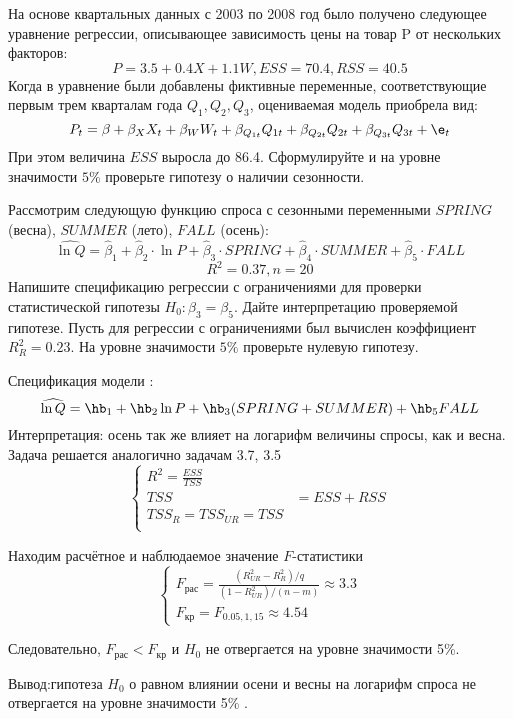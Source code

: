 \documentclass[pdftex,11pt,openany]{book}\usepackage[]{graphicx}\usepackage[]{color}
\begin{document}
\begin{problem} %
 На основе квартальных данных с 2003 по 2008 год было получено следующее уравнение регрессии, описывающее зависимость цены на товар P от нескольких факторов:
\[
P=3.5+0.4X+1.1W, ESS=70.4, RSS=40.5
\]
Когда в уравнение были добавлены фиктивные переменные, соответствующие первым
трем кварталам года $Q_1, Q_2, Q_3$, оцениваемая модель приобрела вид:
\[
P_t=\beta+\beta_X X_t+\beta_W W_t+\beta_{Q_{1t}} Q_{1t}+\beta_{Q_{2t}} Q_{2t}+\beta_{Q_{3t}} Q_{3t}+\e_t
\]
При этом величина $ESS$ выросла до 86.4. Сформулируйте и на уровне значимости $5\%$ проверьте гипотезу о наличии сезонности.
\end{problem}

\begin{solution}
\end{solution}


\begin{problem} %
 Рассмотрим следующую функцию спроса с сезонными переменными $SPRING$ (весна), $SUMMER$ (лето), $FALL$ (осень):
\[
\widehat{\ln Q}=\hat{\beta}_1+\hat{\beta}_2\cdot{\ln P}+\hat{\beta}_3\cdot{SPRING}+\hat{\beta}_4\cdot{SUMMER}+\hat{\beta}_5\cdot{FALL}
\]
\[
R^2=0.37,n=20
\]
Напишите спецификацию регрессии с ограничениями для проверки статистической гипотезы $H_0: \beta_3 = \beta_5$. Дайте интерпретацию проверяемой гипотезе. Пусть для регрессии с ограничениями был вычислен коэффициент $R_{R}^2=0.23$. На уровне значимости $5\%$ проверьте нулевую гипотезу.
\end{problem}

\begin{solution}
Спецификация модели : 
\[
\widehat{\ln{Q}} = \hb_1+\hb_2 \ln{P}+\hb_3(SPRING+SUMMER)+\hb_5 FALL 
\]
Интерпретация: осень так же влияет на логарифм величины спросы, как и весна. Задача решается аналогично задачам 3.7, 3.5
\[
\begin{cases}
R^2=\frac{ESS}{TSS}\\
TSS&=ESS+RSS\\
TSS_R=TSS_{UR}=TSS\\
\end{cases}
\]

Находим расчётное и наблюдаемое значение $F$-статистики
\[
\begin{cases}
F_{\text{рас}}=\frac{(R_{UR}^2-R_{R}^2)/q}{(1-R^2_{UR})/(n-m)}\approx3.3\\
F_{\text{кр}}= F_{0.05,1,15}\approx 4.54
\end{cases}
\]

Следовательно, $F_{\text{рас}}<F_{\text{кр}}$ и $H_0$ не отвергается на уровне значимости 5\%.

Вывод:гипотеза $H_0$ о равном влиянии осени и весны на логарифм спроса не отвергается на уровне значимости 5\% .
\end{solution}
\end{document}

